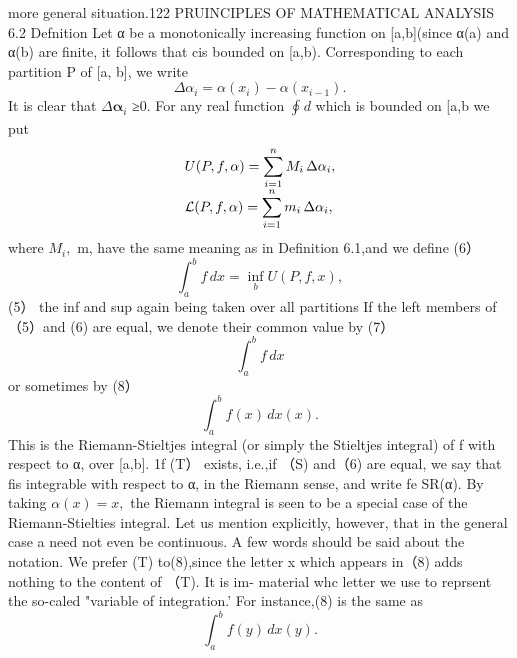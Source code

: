 more general situation.122 PRUINCIPLES OF MATHEMATICAL ANALYSIS 6.2 Defnition Let α be a monotonically increasing function on [a,b](since α(a) and α(b) are finite, it follows that cis bounded on [a,b). Corresponding to each partition P of [a, b], we write $$ \Delta\alpha_{i}=\alpha(x_{i})-\alpha(x_{i-1}). $$ It is clear that $\Delta{\boldsymbol{\alpha}}_{i}$ ≥0. For any real function $\oint_{}^{}d$ which is bounded on [a,b we put $$ \begin{array}{l c r}{{U(P,f,\alpha)=\displaystyle\sum_{i=1}^{n}M_{i}\,\Delta\alpha_{i},}}\\ {{{\cal L}(P,f,\alpha)=\displaystyle\sum_{i=1}^{n}m_{i}\,\Delta\alpha_{i},}}\end{array} $$ where $M_{i},$ m, have the same meaning as in Definition 6.1,and we define (6） $$ \textstyle\int_{a}^{b}f\,d x=\operatorname*{inf}_{b}U(P,f,x), $$ (5） the inf and sup again being taken over all partitions If the left members of（5）and (6) are equal, we denote their common value by (7） $$ \textstyle\int_{a}^{b}f\,d x $$ or sometimes by (8） $$ \textstyle\int_{a}^{b}f(x)\,d x(x). $$ This is the Riemann-Stieltjes integral (or simply the Stieltjes integral) of f with respect to α, over [a,b]. 1f (T） exists, i.e.,if （S) and（6) are equal, we say that fis integrable with respect to α, in the Riemann sense, and write fe SR(α). By taking $\alpha(x)=x,$ the Riemann integral is seen to be a special case of the Riemann-Stielties integral. Let us mention explicitly, however, that in the general case a need not even be continuous. A few words should be said about the notation. We prefer (T) to(8),since the letter x which appears in（8) adds nothing to the content of （T). It is im- material whc letter we use to reprsent the so-caled "variable of integration.’ For instance,(8) is the same as $$ \textstyle\int_{a}^{b}f(y)\,d x(y). $$
